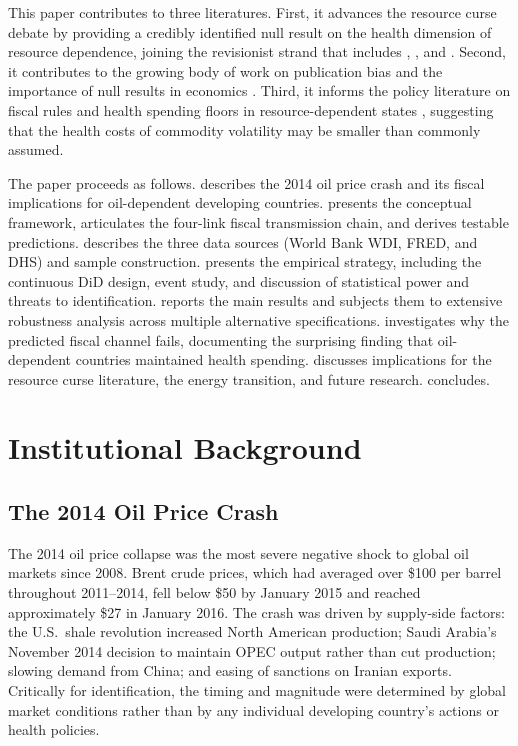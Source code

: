 \documentclass[12pt]{article}
\begin{document}
This paper contributes to three literatures. First, it advances the resource curse debate \citep{sachs1995natural, sachs2001curse, ross2015resource, haber2011resource} by providing a credibly identified null result on the health dimension of resource dependence, joining the revisionist strand that includes \citet{brunnschweiler2008curse}, \citet{caselli2013oil}, and \citet{arezki2011oil}. Second, it contributes to the growing body of work on publication bias and the importance of null results in economics \citep{franco2014publication, andrews2019identification}. Third, it informs the policy literature on fiscal rules and health spending floors in resource-dependent states \citep{gupta2001transition, stuckler2009budget}, suggesting that the health costs of commodity volatility may be smaller than commonly assumed.

The paper proceeds as follows.  describes the 2014 oil price crash and its fiscal implications for oil-dependent developing countries.  presents the conceptual framework, articulates the four-link fiscal transmission chain, and derives testable predictions.  describes the three data sources (World Bank WDI, FRED, and DHS) and sample construction.  presents the empirical strategy, including the continuous DiD design, event study, and discussion of statistical power and threats to identification.  reports the main results and subjects them to extensive robustness analysis across multiple alternative specifications.  investigates why the predicted fiscal channel fails, documenting the surprising finding that oil-dependent countries maintained health spending.  discusses implications for the resource curse literature, the energy transition, and future research.  concludes.


\section{Institutional Background}
\label{sec:background}

\subsection{The 2014 Oil Price Crash}

The 2014 oil price collapse was the most severe negative shock to global oil markets since 2008. Brent crude prices, which had averaged over \$100 per barrel throughout 2011--2014, fell below \$50 by January 2015 and reached approximately \$27 in January 2016. The crash was driven by supply-side factors: the U.S.\ shale revolution increased North American production; Saudi Arabia's November 2014 decision to maintain OPEC output rather than cut production; slowing demand from China; and easing of sanctions on Iranian exports. Critically for identification, the timing and magnitude were determined by global market conditions rather than by any individual developing country's actions or health policies.
\end{document}
